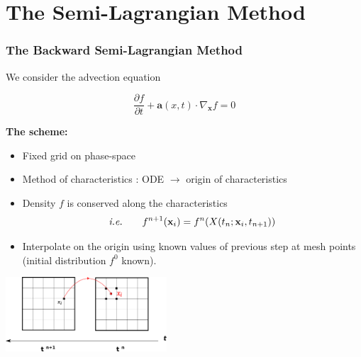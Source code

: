 \documentclass[]{beamer}
\begin{document}
\begin{frame}
\end{frame}




\section{The Semi-Lagrangian Method} 
\begin{frame}
	\frametitle{The Backward Semi-Lagrangian Method}

	We consider the advection equation\vspace{-0.2cm}

	\begin{equation}
		\dfrac{\partial f}{\partial t} + \mathbf{a} (x, t) \cdot \nabla_\mathbf{x} f = 0
	\end{equation}\vspace{-0.5cm}

	\textbf{The scheme:}

	\begin{itemize}
		\item Fixed grid on phase-space
		\item Method of characteristics : ODE $\longrightarrow$ origin of characteristics
		\item Density $f$ is conserved along the characteristics
			\begin{equation}
			\text{\it{i.e.}} \quad \quad f^{n+1}(\mathbf{x}_i) = f^n(X(t_n; \mathbf{x}_i, t_{n+1}))
			\end{equation}
		\item Interpolate on the origin using known values of previous step at mesh points (initial distribution $f^0$ known).
	\end{itemize}

	\begin{center}
    		\includegraphics[width = 0.45\textwidth]{SL.png}
	\end{center}
\end{frame}
\end{document}
